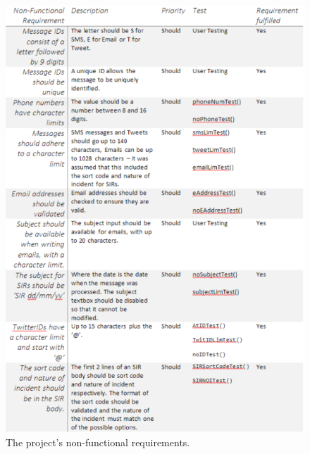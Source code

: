 \documentclass[a4paper]{article}
\begin{document}
\begin{thebibliography}{9}
\begin{figure}
\centering
\includegraphics[width=1\textwidth]{noRequirements.PNG}
\caption{\label{fig:noRequirementsTable}The project's non-functional requirements.}
\end{figure}


\end{thebibliography}
\end{document}
